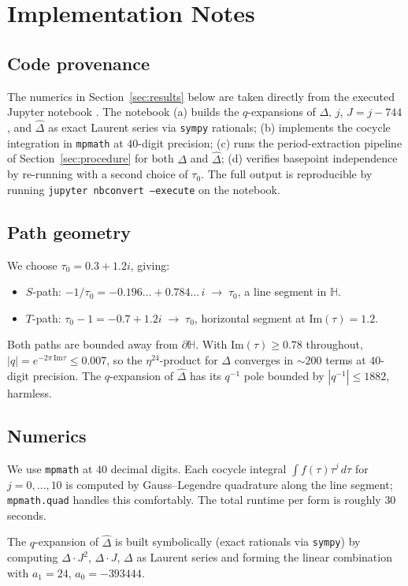 \documentclass[11pt,letterpaper]{article}
\newcommand{\HH}{\mathbb{H}}
\newcommand{\Dhat}{\widehat{\Delta}}
\newcommand{\im}{\mathrm{Im}}
\begin{document}
\section{Implementation Notes}

\subsection*{Code provenance}
The numerics in Section~\ref{sec:results} below are taken directly from the executed Jupyter notebook \cite{Notebook}. The notebook (a) builds the $q$-expansions of $\Delta$, $j$, $J = j-744$, and $\Dhat$ as exact Laurent series via \texttt{sympy} rationals; (b) implements the cocycle integration in \texttt{mpmath} at $40$-digit precision; (c) runs the period-extraction pipeline of Section~\ref{sec:procedure} for both $\Delta$ and $\Dhat$; (d) verifies basepoint independence by re-running with a second choice of $\tau_0$. The full output is reproducible by running \texttt{jupyter nbconvert --execute} on the notebook.

\subsection*{Path geometry}
We choose $\tau_0 = 0.3 + 1.2 i$, giving:
\begin{itemize}[itemsep=0pt]
  \item $S$-path: $-1/\tau_0 = -0.196\ldots + 0.784\ldots\, i \;\to\; \tau_0$, a line segment in $\HH$.
  \item $T$-path: $\tau_0 - 1 = -0.7 + 1.2 i \;\to\; \tau_0$, horizontal segment at $\im(\tau) = 1.2$.
\end{itemize}
Both paths are bounded away from $\partial\HH$. With $\im(\tau) \ge 0.78$ throughout, $|q| = e^{-2\pi\,\im\tau} \le 0.007$, so the $\eta^{24}$-product for $\Delta$ converges in $\sim 200$ terms at $40$-digit precision. The $q$-expansion of $\Dhat$ has its $q^{-1}$ pole bounded by $|q^{-1}| \le 1882$, harmless.

\subsection*{Numerics}
We use \texttt{mpmath} at $40$ decimal digits. Each cocycle integral $\int f(\tau)\tau^j\,d\tau$ for $j = 0, \ldots, 10$ is computed by Gauss--Legendre quadrature along the line segment; \texttt{mpmath.quad} handles this comfortably. The total runtime per form is roughly $30$ seconds.

The $q$-expansion of $\Dhat$ is built symbolically (exact rationals via \texttt{sympy}) by computing $\Delta\cdot J^2$, $\Delta\cdot J$, $\Delta$ as Laurent series and forming the linear combination with $a_1 = 24$, $a_0 = -393444$.
\end{document}
